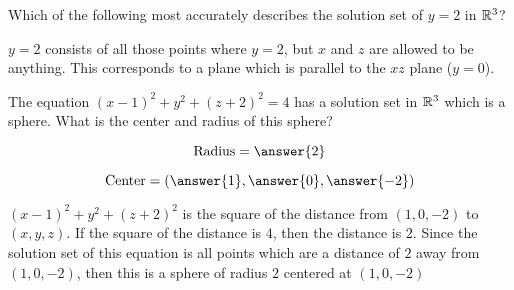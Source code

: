 \documentclass{ximera}
\begin{document}
\begin{question}
	Which of the following most accurately describes the solution
        set of $y=2$ in $\mathbb R^3$?
	
	\begin{multipleChoice}
	\end{multipleChoice}

\begin{hint}
	$y=2$ consists of all those points where $y=2$, but $x$ and
  $z$ are allowed to be anything.  This corresponds to a plane which
  is parallel to the $xz$ plane ($y=0$).
\end{hint}
	
\end{question}

\begin{question}
	The equation $(x-1)^2+y^2+(z+2)^2 = 4$ has a solution set in
        $\mathbb R^3$ which is a sphere.  What is the center and
        radius of this sphere?
	
\[
\text{Radius} = \answer{2}
\]

\[
\text{Center} = \left(\answer{1},\answer{0}, \answer{-2} \right)
\]

\begin{hint}
	$(x-1)^2+y^2+(z+2)^2$ is the square of the distance from
  $(1,0,-2)$ to $(x,y,z)$.  If the square of the distance is $4$, then
  the distance is $2$.  Since the solution set of this equation is all
  points which are a distance of $2$ away from $(1,0,-2)$, then this
  is a sphere of radius $2$ centered at $(1,0,-2)$
\end{hint}
\end{question}
\end{document}
